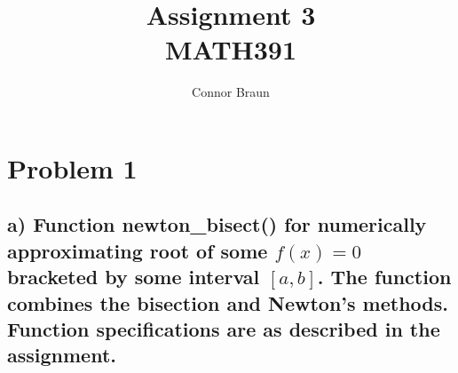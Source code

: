 \documentclass[11pt, letterpaper]{article}
\begin{document}
\title{Assignment 3\\\normalsize MATH391}
\author{Connor Braun}

\allowdisplaybreaks

\maketitle
\section*{Problem 1}
\subsection*{a) \normalfont Function newton\_bisect() for numerically approximating root of some $f(x)=0$
bracketed by some interval $[a,b]$. The function combines the bisection and Newton's methods. Function specifications
are as described in the assignment.}
\end{document}
